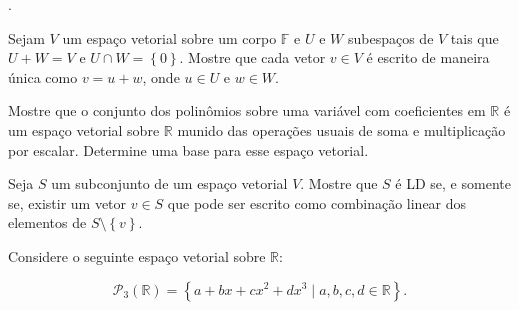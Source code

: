 \begin{questions}
\begin{solutionordottedlines}
\begin{parts}
			.
		\end{parts}
	\end{solutionordottedlines}

	\question\label{exercício:2.4}

	Sejam $V$ um espaço vetorial sobre um corpo $\mathbb{F}$ e $U$ e
	$W$ subespaços de $V$ tais que $U+W=V$ e
	$U\cap W=\left\{0\right\}$.
	Mostre que cada vetor $v\in V$ é escrito de maneira única como
	$v=u+w$, onde $u\in U$ e $w\in W$.

	\begin{solutionordottedlines}
	\end{solutionordottedlines}

	\question\label{exercício:2.5}

	Mostre que o conjunto dos polinômios sobre uma variável com
	coeficientes em $\mathbb{R}$ é um espaço vetorial sobre
	$\mathbb{R}$ munido das operações usuais de soma e multiplicação
	por escalar.
	Determine uma base para esse espaço vetorial.

	\begin{solutionordottedlines}
	\end{solutionordottedlines}

	\question\label{exercício:2.6}

	Seja $S$ um subconjunto de um espaço vetorial $V$.
	Mostre que $S$ é LD se, e somente se, existir um vetor $v\in S$ que
	pode ser escrito como combinação linear dos elementos de
	$S\setminus\left\{v\right\}$.

	\begin{solutionordottedlines}
	\end{solutionordottedlines}

	\question\label{exercício:2.7}

	Considere o seguinte espaço vetorial sobre $\mathbb{R}$:

	\[
		\mathcal{P}_{3}
		\left(\mathbb{R}\right)=
		\left\{
		a+bx+cx^{2}+dx^{3}\mid
		a,b,c,d\in\mathbb{R}
		\right\}.
	\]

\end{questions}
